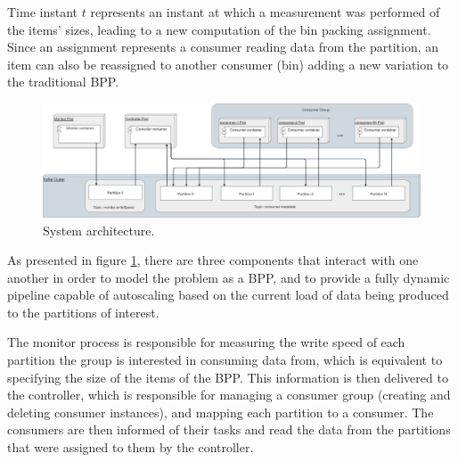 Time instant $t$ represents an instant at which a measurement was performed
of the items' sizes, leading to a new computation of the bin packing assignment.
Since an assignment represents a consumer reading data from the partition, an
item can also be reassigned to another consumer (bin) adding a new variation to the
traditional BPP. 

\begin{figure}[htb!] \centering
    \includegraphics[width=\textwidth]{images/controller/System Design.png}
    \caption{System architecture.} 
    \label{fig:system_architecture}
\end{figure}

As presented in figure \ref{fig:system_architecture}, there are three components
that interact with one another in order to model the problem as a BPP, and to
provide a fully dynamic pipeline capable of autoscaling based on the current
load of data being produced to the partitions of interest.

The monitor process is responsible for measuring the write speed of each
partition the group is interested in consuming data from, which is equivalent to
specifying the size of the items of the BPP.  This information is then delivered
to the controller, which is responsible for managing a consumer group (creating
and deleting consumer instances), and mapping each partition to a consumer. The
consumers are then informed of their tasks and read the data from the partitions
that were assigned to them by the controller.

